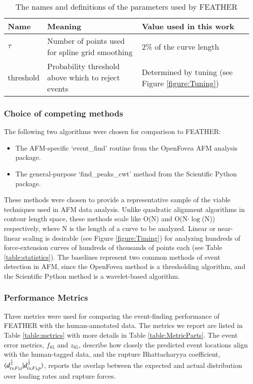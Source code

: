\documentclass[%
  aip,12pt,tightenlines,
  amsthm,
 amsmath,amssymb
]{article}
\newcommand{\e}[0]{\\ \hline}
\newcommand{\tRef}[1]{Table \ref{table:#1}}
\newcommand{\fRef}[1]{Figure \ref{figure:#1}}
\newcommand{\tLabel}[1]{\label{table:#1}}
\newcommand{\sLabel}[1]{\label{section:#1}}
\newcommand{\firstp}[0]{}
\newcommand{\pl}[0]{\vspace{6pt}}
\newcommand{\name}[0]{FEATHER}
\newcommand{\bc}[0]{Bhattacharyya}
\begin{document}
\begin{table}
\begin{tabularx}{\textwidth}{ l | l | l | l  }
\hline \hline
Name & Meaning  & Value used in this work \e
$\tau$ & Number of points used for spline grid smoothing & 2\% of the curve length \e
threshold & Probability threshold above which to reject events  & Determined by tuning (see \fRef{Tuning}) \e
\end{tabularx}
\caption[Algorithm parameters]{\tLabel{Parameters} The names and definitions of the parameters used by \name{}}
\end{table}


\subsubsection{\sLabel{Compare}Choice of competing methods}

\firstp The following two algorithms were chosen for comparison to \name{}: \pl

\begin{itemize}
\item The AFM-specific `event\_find' routine from the OpenFovea AFM analysis package.\cite{roduit_openfovea:_2012}
\item The general-purpose `find\_peaks\_cwt' method from the Scientific Python package.\cite{Jones_SciPy:_2001}
\end{itemize}

 These methods were chosen to provide a representative sample of the viable techniques used in AFM data analysis. Unlike quadratic alignment algorithms in contour length space, these methods scale like O(N) and O(N$\cdot\log$(N)) respectively, where N is the length of a curve to be analyzed. Linear or near-linear scaling is desirable (see \fRef{Timing}) for analyzing hundreds of force-extension curves of hundreds of thousands of points each (see \tRef{statistics}). The baselines represent two common methods of event detection in AFM, since the OpenFovea method is a thresholding algorithm, and the Scientific Python method is a wavelet-based algorithm. \pl

\subsubsection{\sLabel{Metrics}Performance Metrics}

\firstp Three metrics were used for comparing the event-finding performance of \name{} with the human-annotated data. The metrics we report are listed in \tRef{metrics} with more details in \tRef{MetricParts}. The event error metrics, $f_{85}$ and $z_{85}$, describe how closely the predicted event locations align with the human-tagged data, and the rupture \bc{} coefficient, $\braket{d_{(\nu,F),t}^{\frac{1}{2}}|d_{(\nu,F),p}^{\frac{1}{2}}}$, reports the overlap between the expected and actual distribution over loading rates and rupture forces. \pl
\end{document}
